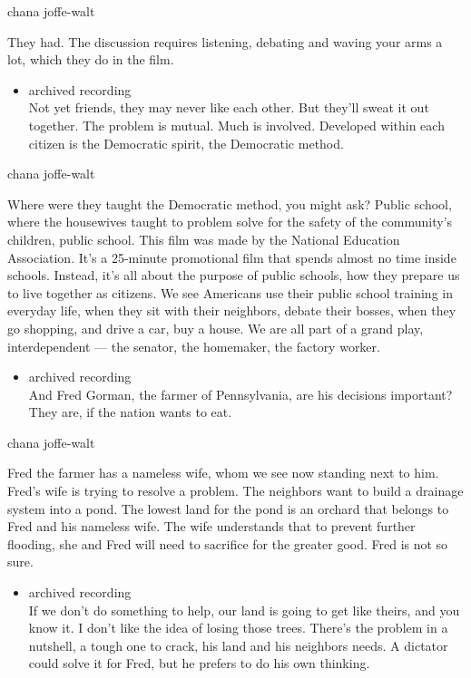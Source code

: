 chana joffe-walt

They had. The discussion requires listening, debating and waving your
arms a lot, which they do in the film.

\begin{itemize}
\tightlist
\item
  archived recording\\
  Not yet friends, they may never like each other. But they'll sweat it
  out together. The problem is mutual. Much is involved. Developed
  within each citizen is the Democratic spirit, the Democratic method.
\end{itemize}

chana joffe-walt

Where were they taught the Democratic method, you might ask? Public
school, where the housewives taught to problem solve for the safety of
the community's children, public school. This film was made by the
National Education Association. It's a 25-minute promotional film that
spends almost no time inside schools. Instead, it's all about the
purpose of public schools, how they prepare us to live together as
citizens. We see Americans use their public school training in everyday
life, when they sit with their neighbors, debate their bosses, when they
go shopping, and drive a car, buy a house. We are all part of a grand
play, interdependent --- the senator, the homemaker, the factory worker.

\begin{itemize}
\tightlist
\item
  archived recording\\
  And Fred Gorman, the farmer of Pennsylvania, are his decisions
  important? They are, if the nation wants to eat.
\end{itemize}

chana joffe-walt

Fred the farmer has a nameless wife, whom we see now standing next to
him. Fred's wife is trying to resolve a problem. The neighbors want to
build a drainage system into a pond. The lowest land for the pond is an
orchard that belongs to Fred and his nameless wife. The wife understands
that to prevent further flooding, she and Fred will need to sacrifice
for the greater good. Fred is not so sure.

\begin{itemize}
\tightlist
\item
  archived recording\\
  If we don't do something to help, our land is going to get like
  theirs, and you know it. I don't like the idea of losing those trees.
  There's the problem in a nutshell, a tough one to crack, his land and
  his neighbors needs. A dictator could solve it for Fred, but he
  prefers to do his own thinking.
\end{itemize}

